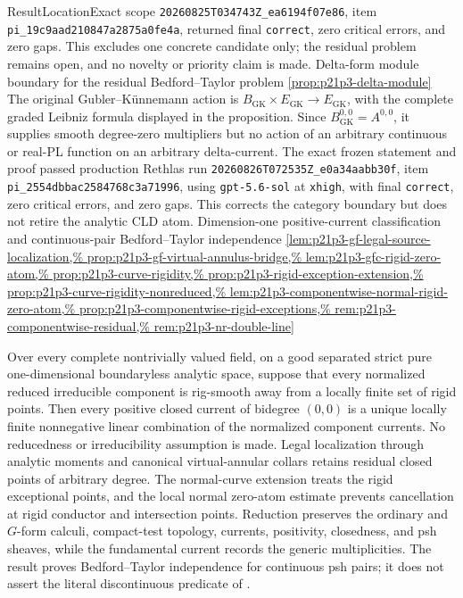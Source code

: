 \begin{AppLProvenanceLedger}{Result}{Location}{Exact scope}
{   \nolinkurl{20260825T034743Z_ea6194f07e86}, item
   \nolinkurl{pi_19c9aad210847a2875a0fe4a}, returned final
   \texttt{correct}, zero critical errors, and zero gaps.  This excludes one
   concrete candidate only; the residual problem remains open, and no
   novelty or priority claim is made.}
\AppLProvenanceRecord
  {Delta-form module boundary for the residual Bedford--Taylor problem}
  {\cref{prop:p21p3-delta-module}}
  {The original Gubler--K\"unnemann action is
   \(B_{\mathrm{GK}}\times E_{\mathrm{GK}}\to E_{\mathrm{GK}}\), with the
   complete graded Leibniz formula displayed in the proposition.  Since
   \(B_{\mathrm{GK}}^{0,0}=A^{0,0}\), it supplies smooth degree-zero
   multipliers but no action of an arbitrary continuous or real-PL function
   on an arbitrary delta-current.  The exact frozen statement and proof
   passed production Rethlas run
   \nolinkurl{20260826T072535Z_e0a34aabb30f}, item
   \nolinkurl{pi_2554dbbac2584768c3a71996}, using
   \texttt{gpt-5.6-sol} at \texttt{xhigh}, with final
   \texttt{correct}, zero critical errors, and zero gaps.  This corrects the
   category boundary but does not retire the analytic CLD atom.}
\AppLProvenanceRecord
  {Dimension-one positive-current classification and continuous-pair
   Bedford--Taylor independence}
  {\cref{lem:p21p3-gf-legal-source-localization,%
   prop:p21p3-gf-virtual-annulus-bridge,%
   lem:p21p3-gfc-rigid-zero-atom,%
   prop:p21p3-curve-rigidity,%
   prop:p21p3-rigid-exception-extension,%
   prop:p21p3-curve-rigidity-nonreduced,%
   lem:p21p3-componentwise-normal-rigid-zero-atom,%
   prop:p21p3-componentwise-rigid-exceptions,%
   rem:p21p3-componentwise-residual,%
   rem:p21p3-nr-double-line}}
  {\begingroup\setlength{\emergencystretch}{2em}%
   Over every complete nontrivially valued field, on a good separated strict
   pure one-dimensional boundaryless analytic space, suppose that every
   normalized reduced irreducible component is rig-smooth away from a
   locally finite set of rigid points.  Then every positive closed current
   of bidegree \((0,0)\) is a unique locally finite nonnegative linear
   combination of the normalized component currents.  No reducedness or
   irreducibility assumption is made.  Legal localization through analytic
   moments and canonical virtual-annular collars retains residual closed
   points of arbitrary degree.  The normal-curve extension treats the rigid
   exceptional points, and the local normal zero-atom estimate prevents
   cancellation at rigid conductor and intersection points.  Reduction
   preserves the ordinary and \(G\)-form calculi, compact-test topology,
   currents, positivity, closedness, and psh sheaves, while the fundamental
   current records the generic multiplicities.  The result proves
   Bedford--Taylor independence for continuous psh pairs; it does not assert
   the literal discontinuous predicate of
   \cite[Definition~8.6.2]{CLD25}.

}
\end{AppLProvenanceLedger}
